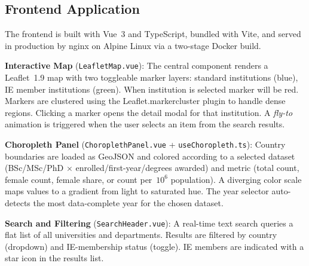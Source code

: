 \documentclass[final,3p,times,twocolumn]{elsarticle}
\begin{document}
\subsection{Frontend Application}

The frontend is built with Vue~3 and TypeScript, bundled with Vite, and served in production by nginx on Alpine Linux via a two-stage Docker build.

\textbf{Interactive Map} (\texttt{LeafletMap.vue}): The central component renders a Leaflet~1.9 map with two toggleable marker layers: standard institutions (blue), IE member institutions (green). When institution is selected marker will be red. Markers are clustered using the Leaflet.markercluster plugin to handle dense regions. Clicking a marker opens the detail modal for that institution. A \textit{fly-to} animation is triggered when the user selects an item from the search results.

\textbf{Choropleth Panel} (\texttt{ChoroplethPanel.vue} + \texttt{useChoropleth.ts}): Country boundaries are loaded as GeoJSON and colored according to a selected dataset (BSc/MSc/PhD $\times$ enrolled/first-year/degrees awarded) and metric (total count, female count, female share, or count per~$10^6$ population). A diverging color scale maps values to a gradient from light to saturated hue. The year selector auto-detects the most data-complete year for the chosen dataset.

\textbf{Search and Filtering} (\texttt{SearchHeader.vue}): A real-time text search queries a flat list of all universities and departments. Results are filtered by country (dropdown) and IE-membership status (toggle). IE members are indicated with a star icon in the results list.
\end{document}
